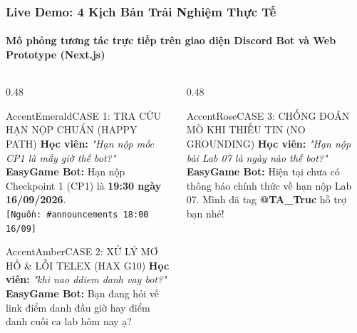 \documentclass[aspectratio=169,10pt]{beamer}
\begin{document}
\begin{frame}
  \frametitle{Live Demo: 4 Kịch Bản Trải Nghiệm Thực Tế}
  \framesubtitle{Mô phỏng tương tác trực tiếp trên giao diện Discord Bot và Web Prototype (Next.js)}

  \begin{columns}[T]
    \begin{column}{0.48\textwidth}
      \begin{chatbubble}{AccentEmerald}{CASE 1: TRA CỨU HẠN NỘP CHUẨN (HAPPY PATH)}
        \tiny
        \textbf{Học viên:} \textit{"Hạn nộp mốc CP1 là mấy giờ thế bot?"}\\[0.05cm]
        \textbf{EasyGame Bot:} \color{TextLight} Hạn nộp Checkpoint 1 (CP1) là \textbf{19:30 ngày 16/09/2026}.\\[0.05cm]
        \color{AccentCyan}\texttt{[Nguồn: \#announcements 18:00 16/09]} \quad \color{AccentEmerald}\checkmark\ 
      \end{chatbubble}

      \vspace{0.15cm}
      \begin{chatbubble}{AccentAmber}{CASE 2: XỬ LÝ MƠ HỒ \& LỖI TELEX (HAX G10)}
        \tiny
        \textbf{Học viên:} \textit{"khi nao ddiem danh vay bot?"}\\[0.05cm]
        \textbf{EasyGame Bot:} \color{TextLight} Bạn đang hỏi về link điểm danh đầu giờ hay điểm danh cuối ca lab hôm nay ạ?\\[0.05cm]
        \color{AccentAmber}
      \end{chatbubble}
    \end{column}

    \begin{column}{0.48\textwidth}
      \begin{chatbubble}{AccentRose}{CASE 3: CHỐNG ĐOÁN MÒ KHI THIẾU TIN (NO GROUNDING)}
        \tiny
        \textbf{Học viên:} \textit{"Hạn nộp bài Lab 07 là ngày nào thế bot?"}\\[0.05cm]
        \textbf{EasyGame Bot:} \color{TextLight} Hiện tại chưa có thông báo chính thức về hạn nộp Lab 07. Mình đã tag \textbf{@TA\_Truc} hỗ trợ bạn nhé!\\[0.05cm]
        \color{AccentRose}
      \end{chatbubble}


\end{column}
\end{columns}
\end{frame}
\end{document}
